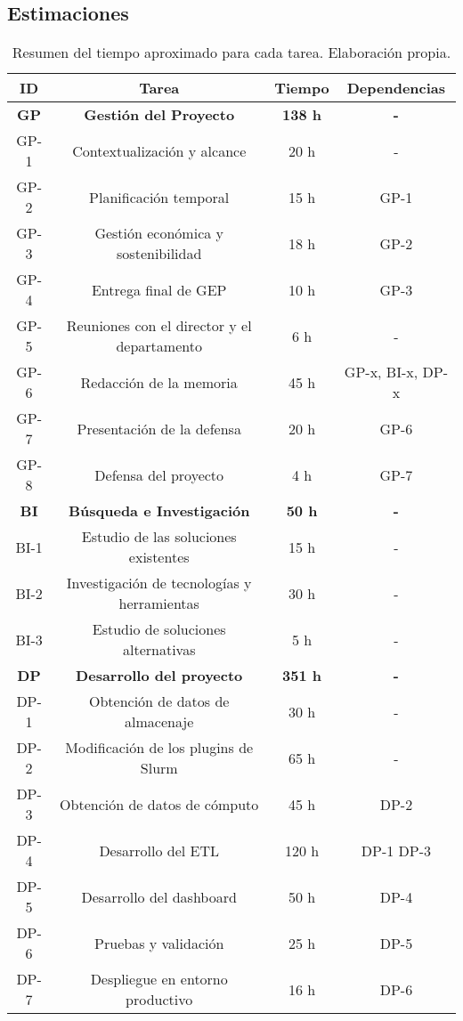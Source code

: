 \subsection{Estimaciones}
\begin{table}[H]
    \centering
    \begin{tabular}{|c|c|c|c|}
        \hline
        \textbf{ID} & \textbf{Tarea} & \textbf{Tiempo} & \textbf{Dependencias} \\
        \hline
        \textbf{GP} & \textbf{Gestión del Proyecto} & \textbf{138 h} & \textbf{-} \\
        \hline
        GP-1 & Contextualización y alcance & 20 h & - \\
        GP-2 & Planificación temporal & 15 h & GP-1 \\
        GP-3 & Gestión económica y sostenibilidad & 18 h & GP-2 \\
        GP-4 & Entrega final de GEP & 10 h & GP-3 \\
        GP-5 & Reuniones con el director y el departamento & 6 h & - \\
        GP-6 & Redacción de la memoria & 45 h & GP-x, BI-x, DP-x\\
        GP-7 & Presentación de la defensa & 20 h & GP-6 \\
        GP-8 & Defensa del proyecto & 4 h & GP-7 \\
        \hline
        \textbf{BI} & \textbf{Búsqueda e Investigación} & \textbf{50 h} & \textbf{-} \\
        \hline
        BI-1 & Estudio de las soluciones existentes & 15 h & - \\
        BI-2 & Investigación de tecnologías y herramientas & 30 h & - \\
        BI-3 & Estudio de soluciones alternativas & 5 h & - \\
        \hline
        \textbf{DP} & \textbf{Desarrollo del proyecto} & \textbf{351 h} & \textbf{-} \\
        \hline
        DP-1 & Obtención de datos de almacenaje & 30 h & - \\
        DP-2 & Modificación de los plugins de Slurm & 65 h & - \\
        DP-3 & Obtención de datos de cómputo & 45 h & DP-2 \\
        DP-4 & Desarrollo del ETL & 120 h & DP-1 DP-3 \\
        DP-5 & Desarrollo del dashboard & 50 h & DP-4 \\
        DP-6 & Pruebas y validación & 25 h & DP-5 \\
        DP-7 & Despliegue en entorno productivo & 16 h & DP-6 \\
        \hline
    \end{tabular}
    \caption{Resumen del tiempo aproximado para cada tarea. Elaboración propia.}
    \label{tab:estimaciones}
\end{table}